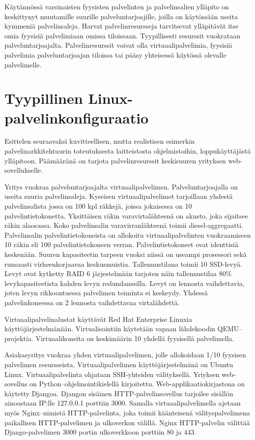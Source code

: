 Käytännössä varsinaisten fyysisten palvelinten ja palvelinsalien ylläpito on keskittynyt muutamille suurille palveluntarjoajille, joilla on käytössään useita kymmeniä palvelinsaleja. Harvat palvelinresursseja tarvitsevat ylläpitävät itse omia fyysisiä palvelimiaan omissa tiloissaan. Tyypillisesti resurssit vuokrataan palveluntarjoajalta. Palvelinresurssit voivat olla virtuaalipalvelimia, fyysisiä palvelimia palveluntarjoajan tiloissa tai pääsy yhteisessä käytössä olevalle palvelimelle.~\cite{virtualizationfordummies}

\section{Tyypillinen Linux-palvelinkonfiguraatio}\label{tyypillinen_palvelinkonfiguraatio}

    Esittelen seuraavaksi kuvitteellisen, mutta realistisen esimerkin palvelinarkkitehtuurin toteutuksesta laitteistosta ohjelmistoihin, loppukäyttäjästä ylläpitoon. Päämääränä on tarjota palvelinresurssit keskisuuren yrityksen web-sovellukselle.

    Yritys vuokraa palveluntarjoajalta virtuaalipalvelimen. Palveluntarjoajalla on useita suuria palvelinsaleja. Kyseisen virtuaalipalvelimet tarjoillaan yhdestä palvelinsalista jossa on 100 kpl räkkejä, joissa jokaisessa on 10 palvelintietokonetta. Yksittäisen räkin varavirtalähteenä on akusto, joka sijaitsee räkin alaosassa. Koko palvelinsalin varavirranlähteenä toimii diesel-aggregaatti. Palvelinsalin palvelintietokoneista on allokoitu virtuaalipalvelinten vuokraamiseen 10 räkin eli 100 palvelintietokoneen verran. Palvelintietokoneet ovat identtisiä keskenään. Suuren kapasiteetin tarpeen vuoksi niissä on useampi prosessori sekä runsaasti virheenkorjaavaa keskusmuistia. Tallennustilana toimii 10 SSD-levyä. Levyt ovat kytketty RAID 6 järjestelmään tarjoten näin tallennustilaa 80\% levykapasiteetista kahden levyn redundanssilla. Levyt on lennosta vaihdettavia, joten levyn rikkoontuessa palvelimen toiminta ei keskeydy. Yhdessä palvelinkoneessa on 2 lennosta vaihdettavaa virtalähdettä.

    Virtuaalipalvelinalustat käyttävät Red Hat Enterprise Linuxia käyttöjärjestelmänään. Virtualisointiin käytetään vapaan lähdekoodin QEMU–projektia. Virtuaalikoneita on keskimäärin 10 yhdellä fyysisellä palvelimella.

    Asiakasyritys vuokraa yhden virtuaalipalvelimen, jolle allokoidaan 1/10 fyysisen palvelimen resursseista. Virtuaalipalvelimen käyttöjärjestelmänä on Ubuntu Linux. Virtuaalipalvelinta ohjataan SSH-yhteiden välityksellä. Yriyksen web-sovellus on Python–ohjelmointikielellä kirjoitettu. Web-applikaatiokirjastona on käytetty Djangoa. Djangon sisäinen HTTP-palvelinsovellus tarjoilee sisällön ainoastaan IP:lle 127.0.0.1 porttiin 3000. Samalla virtuaalipalvelimella ajetaan myös Nginx–nimistä HTTP-palvelinta, joka toimii käänteisenä välityspalvelimena paikallisen HTTP-palvelimen ja ulkoverkon välillä. Nginx HTTP-palvelin välittää Django-palvelimen 3000 portin ulkoverkkoon porttiin 80 ja 443.

